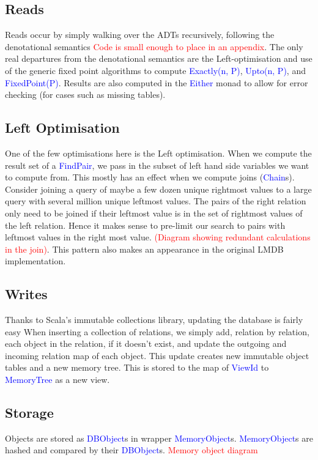 \documentclass[12pt,a4paper,twoside,openright]{report}
\newcommand\todo[1]{\textcolor{red}{#1}}
\newcommand\codeName[1]{\textcolor{blue}{#1}}
\begin{document}
	
	\subsection{Reads}
Reads occur by simply walking over the ADTs recursively, following the denotational semantics \todo{Code is small enough to place in an appendix}. The only real departures from the denotational semantics are the Left-optimisation and use of the generic fixed point algorithms to compute \codeName{Exactly(n, P)}, \codeName{Upto(n, P)}, and \codeName{FixedPoint(P)}. Results are also computed in the \codeName{Either} monad to allow for error checking (for cases such as missing tables).
	
	\subsection{Left Optimisation}
	One of the few optimisations here is the Left optimisation. When we compute the result set of a \codeName{FindPair}, we pass in the subset of left hand side variables we want to compute from. This mostly has an effect when we compute joins (\codeName{Chain}s). Consider joining a query of maybe a few dozen unique rightmost values to a large query with several million unique leftmost values. The pairs of the right relation only need to be joined if their leftmost value is in the set of rightmost values of the left relation. Hence it makes sense to pre-limit our search to pairs with leftmost values in the right most value. \todo{(Diagram showing redundant calculations in the join)}. This pattern also makes an appearance in the original LMDB implementation.
	\subsection{Writes}
	Thanks to Scala’s immutable collections library, updating the database is fairly easy When inserting a collection of relations, we simply add, relation by relation, each object in the relation, if it doesn’t exist, and update the outgoing and incoming relation map of each object. This update creates new immutable object tables and a new memory tree. This is stored to the map of \codeName{ViewId}  to \codeName{MemoryTree} as a new view.

	\subsection{Storage}
	Objects are stored as \codeName{DBObject}s in wrapper \codeName{MemoryObject}s. \codeName{MemoryObject}s  are hashed and compared by their \codeName{DBObject}s. \todo{Memory object diagram}
	
\end{document}

